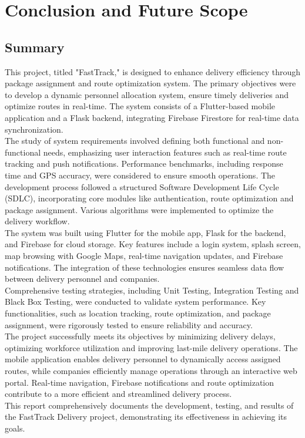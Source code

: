 \chapter{Conclusion and Future Scope}
\label{conclusion}

\section{Summary}
This project, titled "FastTrack," is designed to enhance delivery efficiency through package assignment and route optimization system. The primary objectives were to develop a dynamic personnel allocation system, ensure timely deliveries and optimize routes in real-time. The system consists of a Flutter-based mobile application and a Flask backend, integrating Firebase Firestore for real-time data synchronization.
\\
The study of system requirements involved defining both functional and non-functional needs, emphasizing user interaction features such as real-time route tracking and push notifications. Performance benchmarks, including response time and GPS accuracy, were considered to ensure smooth operations. The development process followed a structured Software Development Life Cycle (SDLC), incorporating core modules like authentication, route optimization and package assignment. Various algorithms were implemented to optimize the delivery workflow.
\\
The system was built using Flutter for the mobile app, Flask for the backend, and Firebase for cloud storage. Key features include a login system, splash screen, map browsing with Google Maps, real-time navigation updates, and Firebase notifications. The integration of these technologies ensures seamless data flow between delivery personnel and companies.
\\
Comprehensive testing strategies, including Unit Testing, Integration Testing and Black Box Testing, were conducted to validate system performance. Key functionalities, such as location tracking, route optimization, and package assignment, were rigorously tested to ensure reliability and accuracy.
\\
The project successfully meets its objectives by minimizing delivery delays, optimizing workforce utilization and improving last-mile delivery operations. The mobile application enables delivery personnel to dynamically access assigned routes, while companies efficiently manage operations through an interactive web portal. Real-time navigation, Firebase notifications and route optimization contribute to a more efficient and streamlined delivery process.
\\
This report comprehensively documents the development, testing, and results of the FastTrack Delivery project, demonstrating its effectiveness in achieving its goals.
